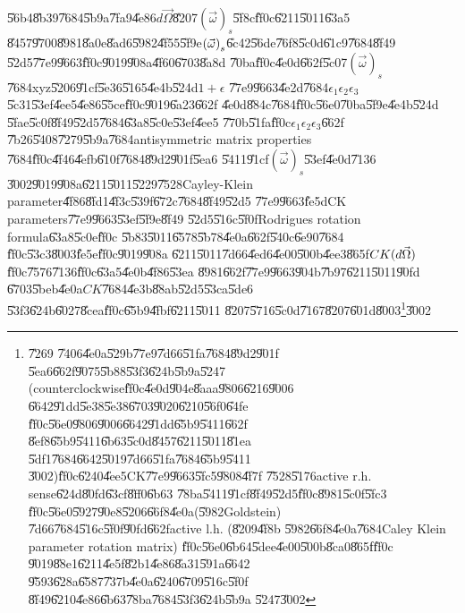 \documentclass[12pt,a4paper]{article}
\begin{document}
\U{56b4}\U{8b39}\U{7684}\U{5b9a}\U{7fa9}\U{4e86}$d\vec{\Omega}$\U{8207}$%
\left( \vec{\omega}\right) _{s}$\U{5f8c}\U{ff0c}\U{6211}\U{5011}\U{63a5}%
\U{8457}\U{9700}\U{8981}\U{8a0e}\U{8ad6}\U{5982}\U{4f55}\U{5f9e}$\left( \vec{%
\omega}\right) _{s}$\U{6c42}\U{56de}\U{76f8}\U{5c0d}\U{61c9}\U{7684}\U{8f49}%
\U{52d5}\U{77e9}\U{9663}\U{ff0c}\U{9019}\U{908a}\U{4f60}\U{6703}\U{8a8d}%
\U{70ba}\U{ff0c}\U{4e0d}\U{662f}\U{5c07}$\left( \vec{\omega}\right) _{s}$%
\U{7684}xyz\U{5206}\U{91cf}\U{5e36}\U{5165}\U{4e4b}\U{524d}$1+\epsilon $%
\U{77e9}\U{9663}\U{4e2d}\U{7684}$\epsilon _{1}\epsilon _{2}\epsilon _{3}$%
\U{5c31}\U{53ef}\U{4ee5}\U{4e86}\U{55ce}\U{ff0c}\U{9019}\U{6a23}\U{662f}%
\U{4e0d}\U{884c}\U{7684}\U{ff0c}\U{56e0}\U{70ba}\U{5f9e}\U{4e4b}\U{524d}%
\U{5fae}\U{5c0f}\U{8f49}\U{52d5}\U{7684}\U{63a8}\U{5c0e}\U{53ef}\U{4ee5}%
\U{770b}\U{51fa}\U{ff0c}$\epsilon _{1}\epsilon _{2}\epsilon _{3}$\U{662f}%
\U{7b26}\U{5408}\U{7279}\U{5b9a}\U{7684}antisymmetric matrix properties%
\U{7684}\U{ff0c}\U{4f46}\U{4efb}\U{610f}\U{7684}\U{89d2}\U{901f}\U{5ea6}%
\U{5411}\U{91cf}$\left( \vec{\omega}\right) _{s}$\U{53ef}\U{4e0d}\U{7136}%
\U{3002}\U{9019}\U{908a}\U{6211}\U{5011}\U{5229}\U{7528}Cayley-Klein
parameter\U{4f86}\U{8fd1}\U{4f3c}\U{539f}\U{672c}\U{7684}\U{8f49}\U{52d5}%
\U{77e9}\U{9663}\U{fe5d}CK parameters\U{77e9}\U{9663}\U{53ef}\U{5f9e}\U{8f49}%
\U{52d5}\U{516c}\U{5f0f}Rodrigues rotation formula\U{63a8}\U{5c0e}\U{ff0c}%
\U{5b83}\U{5011}\U{6578}\U{5b78}\U{4e0a}\U{662f}\U{540c}\U{6e90}\U{7684}%
\U{ff0c}\U{53c3}\U{8003}\cite{goldstein}\U{fe5e}\U{ff0c}\U{9019}\U{908a}%
\U{6211}\U{5011}\U{7d66}\U{4ed6}\U{4e00}\U{500b}\U{4ee3}\U{865f}$CK(d\vec{%
\Omega})$\U{ff0c}\U{7576}\U{7136}\U{ff0c}\U{63a5}\U{4e0b}\U{4f86}\U{53ea}%
\U{8981}\U{662f}\U{77e9}\U{9663}\U{904b}\U{7b97}\U{6211}\U{5011}\U{90fd}%
\U{6703}\U{5beb}\U{4e0a}$CK$\U{7684}\U{4e3b}\U{88ab}\U{52d5}\U{53ca}\U{5de6}%
\U{53f3}\U{624b}\U{6027}\U{8cea}\U{ff0c}\U{65b9}\U{4fbf}\U{6211}\U{5011}%
\U{8207}\U{5716}\U{5c0d}\U{7167}\U{8207}\U{601d}\U{8003}\footnote{\U{7269}%
\U{7406}\U{4e0a}\U{529b}\U{77e9}\U{7d66}\U{51fa}\U{7684}\U{89d2}\U{901f}%
\U{5ea6}\U{662f}\U{9075}\U{5b88}\U{53f3}\U{624b}\U{5b9a}\U{5247}%
(counterclockwise\U{ff0c}\U{4e0d}\U{904e}\U{8aaa}\U{9806}\U{6216}\U{9006}%
\U{6642}\U{91dd}\U{5e38}\U{5e38}\U{6703}\U{9020}\U{6210}\U{56f0}\U{64fe}%
\U{ff0c}\U{56e0}\U{9806}\U{9006}\U{6642}\U{91dd}\U{65b9}\U{5411}\U{662f}%
\U{8ef8}\U{65b9}\U{5411}\U{6b63}\U{5c0d}\U{8457}\U{6211}\U{5011}\U{81ea}%
\U{5df1}\U{7684}\U{6642}\U{5019}\U{7d66}\U{51fa}\U{7684}\U{65b9}\U{5411}%
\U{3002})\U{ff0c}\U{6240}\U{4ee5}CK\U{77e9}\U{9663}\U{5fc5}\U{9808}\U{4f7f}%
\U{7528}\U{5176}active r.h. sense\U{624d}\U{80fd}\U{63cf}\U{8ff0}\U{6b63}%
\U{78ba}\U{5411}\U{91cf}\U{8f49}\U{52d5}\U{ff0c}\U{8981}\U{5c0f}\U{5fc3}%
\U{ff0c}\U{56e0}\U{5927}\U{90e8}\U{5206}\U{66f8}\U{4e0a}(\U{5982}Goldstein)%
\U{7d66}\U{7684}\U{516c}\U{5f0f}\U{90fd}\U{662f}active l.h. (\U{8209}\U{4f8b}%
\U{5982}\U{66f8}\U{4e0a}\U{7684}Caley Klein parameter rotation matrix)%
\U{ff0c}\U{56e0}\U{6b64}\U{5dee}\U{4e00}\U{500b}\U{8ca0}\U{865f}\U{ff0c}%
\U{9019}\U{88e1}\U{6211}\U{4e5f}\U{82b1}\U{4e86}\U{8a31}\U{591a}\U{6642}%
\U{9593}\U{628a}\U{6587}\U{737b}\U{4e0a}\U{6240}\U{6709}\U{516c}\U{5f0f}%
\U{8f49}\U{6210}\U{4e86}\U{6b63}\U{78ba}\U{7684}\U{53f3}\U{624b}\U{5b9a}%
\U{5247}\U{3002}}\U{3002}%
\end{document}
